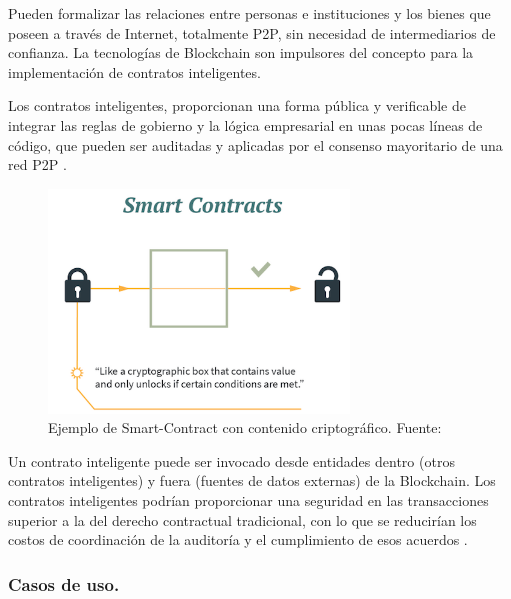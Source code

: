 \vspace{5mm}

\noindent Pueden formalizar las relaciones entre personas e instituciones y los bienes que poseen a través de Internet, 
totalmente P2P, sin necesidad de intermediarios de confianza. La tecnologías de Blockchain son impulsores del concepto 
para la implementación de contratos inteligentes.

\vspace{5mm}

\noindent Los contratos inteligentes, proporcionan una forma pública y verificable de integrar las reglas de gobierno y 
la lógica empresarial en unas pocas líneas de código, que pueden ser auditadas y aplicadas por el consenso mayoritario 
de una red P2P \cite{what-is-smart-contract}.

\vspace{5mm}

\begin{figure}[ht!]
    \centering
    \includegraphics[width=8cm]{imagenes/herramientas/smart-contracts}
    \caption{Ejemplo de Smart-Contract con contenido criptográfico. Fuente: \cite{what-is-smart-contract}}
\end{figure}

\vspace{5mm}

\noindent Un contrato inteligente puede ser invocado desde entidades dentro (otros contratos inteligentes) y fuera 
(fuentes de datos externas) de la Blockchain. Los contratos inteligentes podrían proporcionar una seguridad en las 
transacciones superior a la del derecho contractual tradicional, con lo que se reducirían los costos de coordinación 
de la auditoría y el cumplimiento de esos acuerdos \cite{what-is-smart-contract}. 

\subsubsection*{Casos de uso.}

